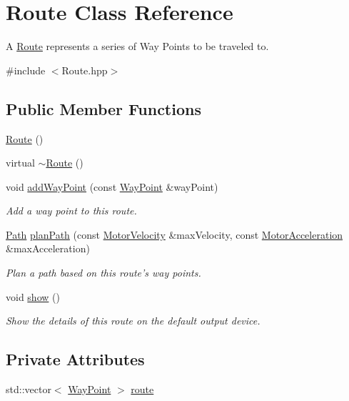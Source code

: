 \hypertarget{classRoute}{\section{Route Class Reference}
\label{classRoute}
}


A \hyperlink{classRoute}{Route} represents a series of Way Points to be traveled to.  




{\ttfamily \#include $<$Route.\-hpp$>$}

\subsection*{Public Member Functions}
\begin{DoxyCompactItemize}
\item 
\hyperlink{classRoute_a2b1c971aaf032109cee8081c97e9b9e9}{Route} ()
\item 
virtual \hyperlink{classRoute_a41212532f2bce3298d8f9468f82c62ab}{$\sim$\-Route} ()
\item 
void \hyperlink{classRoute_a9411954ba50c930277bbb52ba3f3e7f4}{add\-Way\-Point} (const \hyperlink{classWayPoint}{Way\-Point} \&way\-Point)
\begin{DoxyCompactList}\small\item\em Add a way point to this route. \end{DoxyCompactList}\item 
\hyperlink{classPath}{Path} \hyperlink{classRoute_a05753c003e81efbe2149ad2f1782d70e}{plan\-Path} (const \hyperlink{classMotorVelocity}{Motor\-Velocity} \&max\-Velocity, const \hyperlink{classMotorAcceleration}{Motor\-Acceleration} \&max\-Acceleration)
\begin{DoxyCompactList}\small\item\em Plan a path based on this route's way points. \end{DoxyCompactList}\item 
void \hyperlink{classRoute_a42290dd852c117fe9549bc63c0b4171c}{show} ()
\begin{DoxyCompactList}\small\item\em Show the details of this route on the default output device. \end{DoxyCompactList}\end{DoxyCompactItemize}
\subsection*{Private Attributes}
\begin{DoxyCompactItemize}
\item 
std\-::vector$<$ \hyperlink{classWayPoint}{Way\-Point} $>$ \hyperlink{classRoute_af5aac5eed6cc4fbcd02e2e817d87db45}{route}
\end{DoxyCompactItemize}


